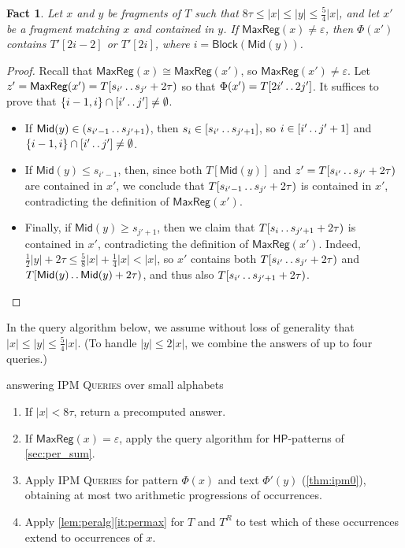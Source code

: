 \documentclass[a4paper]{article}
\newtheorem{fact}[theorem]{Fact}
\theoremstyle{definition}
\theoremstyle{remark}
\newcommand{\IPM}{\textsc{IPM Queries}\xspace}
\newcommand{\HP}{\mathsf{HP}}
\newcommand{\eps}{\varepsilon}
\newcommand{\dd}{\mathinner{\ldotp\ldotp}}
\newcommand{\MaxReg}{\mathsf{MaxReg}}
\newcommand{\Mid}{\mathsf{Mid}}
\newcommand{\BLOCK}{\mathsf{Block}}
\begin{document}
\begin{fact}\label{fct:easy}
Let $x$ and $y$ be fragments of $T$ such that $8\tau \le |x| \le |y| \le \frac54|x|$, and
let $x'$ be a fragment matching $x$ and contained in $y$.
If $\MaxReg(x)\ne \eps$, then $\Phi(x')$ contains $T'[2i-2]$ or $T'[2i]$, where $i=\BLOCK(\Mid(y))$.
\end{fact}
\begin{proof}
Recall that $\MaxReg(x)\cong \MaxReg(x')$, so $\MaxReg(x')\ne \eps$.
Let $z'=\MaxReg(x')=T[s_{i'} \dd s_{j'}+2\tau)$ so that $\Phi(x')=T[2i'\dd 2j']$.
It suffices to prove that $\{i-1,i\} \cap [i'\dd j'] \ne \emptyset$.
\begin{itemize}
\item
If $\Mid(y)\in (s_{i'-1} \dd s_{j'+1})$, then $s_i \in [s_{i'}\dd s_{j'+1}]$, so $i \in [i' \dd j'+1]$ and $\{i-1,i\} \cap [i'\dd j'] \ne \emptyset$.

\smallskip
\item If $\Mid(y) \le s_{i'-1}$, then, since both $T[\Mid(y)]$ and $z'=T[s_{i'}\dd s_{j'}+2\tau)$ are contained in $x'$,
we conclude that $T[s_{i'-1}\dd s_{j'}+2\tau)$ is contained in $x'$, contradicting the definition of $\MaxReg(x')$.

\smallskip
\item Finally, if $\Mid(y)\ge s_{j'+1}$, then we claim that $T[s_{i}\dd s_{j'+1}+2\tau)$ is contained in $x'$,
contradicting the definition of $\MaxReg(x')$.
Indeed, $\tfrac12 |y|+2\tau \le \frac58|x| + \frac14|x| < |x|$,
so $x'$ contains both $T[s_{i'}\dd s_{j'}+2\tau)$ and $T[\Mid(y)\dd \Mid(y)+2\tau)$,
and thus also $T[s_{i'}\dd s_{j'+1}+2\tau)$. \qedhere
\end{itemize}
\end{proof}

In the query algorithm below, we assume without loss of generality that $|x| \le |y| \le \frac54|x|$.
(To handle $|y|\le 2|x|$, we combine the answers of up to four queries.)

\begin{center}
\begin{minipage}{14cm}
 answering \IPM over small alphabets

  \begin{enumerate}[label=(\Alph*)]
    \item\label{Step:A} If $|x|<8\tau$, return a precomputed answer.
    \item\label{Step:B} If $\MaxReg(x)=\varepsilon$, apply the query algorithm for $\HP$-patterns of \cref{sec:per_sum}.
    \item\label{Step:C} Apply \IPM for pattern $\Phi(x)$ and text $\Phi'(y)$ (\cref{thm:ipm0}), obtaining
    at most two arithmetic progressions of occurrences.
    \item\label{Step:D} 
    Apply \cref{lem:peralg}\ref{it:permax} for $T$ and $T^R$ to test which of these occurrences extend to occurrences of $x$.
  \end{enumerate}
  \end{minipage}
\end{center}
\end{document}
